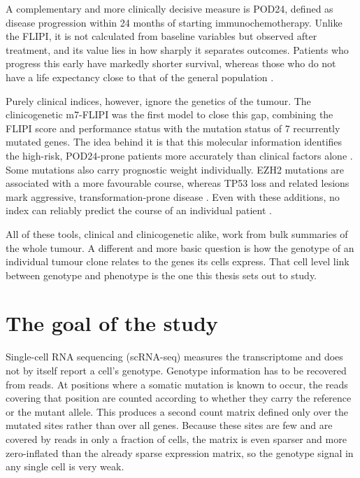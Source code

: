 A complementary and more clinically decisive measure is POD24, defined as disease progression within 24 months of starting immunochemotherapy.
Unlike the FLIPI, it is not calculated from baseline variables but observed after treatment, and its value lies in how sharply it separates outcomes.
Patients who progress this early have markedly shorter survival, whereas those who do not have a life expectancy close to that of the general population \cite{casulo_early_2015}.

Purely clinical indices, however, ignore the genetics of the tumour.
The clinicogenetic m7-FLIPI was the first model to close this gap, combining the FLIPI score and performance status with the mutation status of 7 recurrently mutated genes.
The idea behind it is that this molecular information identifies the high-risk, POD24-prone patients more accurately than clinical factors alone \cite{pastore_integration_2015,jurinovic_clinicogenetic_2016}.
Some mutations also carry prognostic weight individually. EZH2 mutations are associated with a more favourable course, whereas TP53 loss and related lesions mark aggressive, transformation-prone disease \cite{jurinovic_clinicogenetic_2016,pasqualucci_genetics_2014}.
Even with these additions, no index can reliably predict the course of an individual patient \cite{boughan_follicular_2019}.

All of these tools, clinical and clinicogenetic alike, work from bulk summaries of the whole tumour.
A different and more basic question is how the genotype of an individual tumour clone relates to the genes its cells express.
That cell level link between genotype and phenotype is the one this thesis sets out to study.

\section{The goal of the study}

Single-cell RNA sequencing (scRNA-seq) measures the transcriptome and does not by itself report a cell's genotype.
Genotype information has to be recovered from reads.
At positions where a somatic mutation is known to occur, the reads covering that position are counted according to whether they carry the reference or the mutant allele.
This produces a second count matrix defined only over the mutated sites rather than over all genes. Because these sites are few and are covered by reads in only a fraction of cells, the matrix is even sparser and more zero-inflated than the already sparse expression matrix, so the genotype signal in any single cell is very weak.

